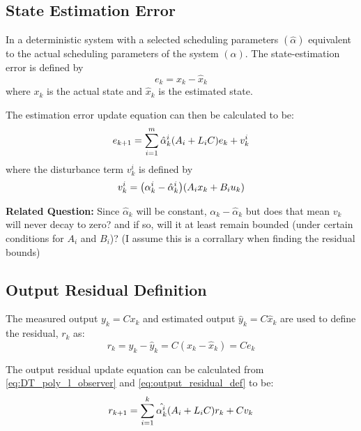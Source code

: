 \documentclass[]{article}
\begin{document}
\subsection{State Estimation Error}
In a deterministic system with a selected scheduling parameters $(\hat{\alpha})$ equivalent to the actual scheduling parameters of the system $({\alpha})$. The state-estimation error is defined by
\begin{equation}\label{eq:est_error_def}
	e_k = x_k - \hat{x}_k
\end{equation}
where $x_k$ is the actual state and $\hat{x}_k$ is the estimated state.

The estimation error update equation can then be calculated to be:
\begin{equation}\label{eq:est_error_update_def}
	e_{k+1} = \sum_{i=1}^{m} \hat{\alpha}_k^i \qty(A_i + L_i C) e_k + v_k^i
\end{equation}
where the disturbance term $v_k^i$ is defined by
\begin{equation}\label{eq:param_error_disturbance_def}
	v_k^i = \qty({\alpha}_k^i - \hat{\alpha}_k^i) \qty(A_i x_k + B_i u_k)
\end{equation}

\textbf{Related Question:} Since $\hat{\alpha}_k$ will be constant, ${\alpha}_k - \hat{\alpha}_k$ but does that mean $v_k$ will never decay to zero? and if so, will it at least remain bounded (under certain conditions for $A_i$ and $B_i$)? (I assume this is a corrallary when finding the residual bounds)

\subsection{Output Residual Definition}
The measured output $y_k = C x_k$ and estimated output $\hat{y}_k = C \hat{x}_k$ are used to define the residual, $r_k$ as:
\begin{equation}\label{eq:output_residual_def}
	r_k = y_k - \hat{y}_k = C(x_k - \hat{x}_k) = C e_k
\end{equation}

The output residual update equation can be calculated from \eqref{eq:DT_poly_l_observer} and \eqref{eq:output_residual_def} to be:
\begin{equation}\label{eq:output_residual_update_def}
	r_{k+1} = \sum_{i=1}^k \hat{\alpha_k^i} \qty(A_i + L_i C) r_k + C v_k
\end{equation}

\newpage
\end{document}
